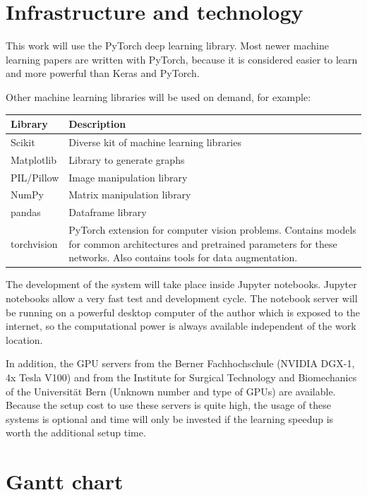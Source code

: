 \section{Infrastructure and technology}
This work will use the PyTorch\cite{paszke2017automatic} deep learning library. Most newer machine learning papers are written with PyTorch, because it is considered easier to learn and more powerful than Keras and PyTorch\cite{pytorchvstensorflow}.

Other machine learning libraries will be used on demand, for example:

\begin{tabular}{|p{3cm}|p{12.5cm}|}
    \hline
    \textbf{Library} & \textbf{Description} \\ \hline
    Scikit & Diverse kit of machine learning libraries \\ \hline
    Matplotlib & Library to generate graphs \\ \hline
    PIL/Pillow & Image manipulation library \\ \hline
    NumPy & Matrix manipulation library \\ \hline
    pandas & Dataframe library \\ \hline
    torchvision & PyTorch extension for computer vision problems. Contains models for common architectures and pretrained parameters for these networks. Also contains tools for data augmentation. \\ \hline
\end{tabular}

The development of the system will take place inside Jupyter notebooks. Jupyter notebooks allow a very fast test and development cycle. The notebook server will be running on a powerful desktop computer of the author which is exposed to the internet, so the computational power is always available independent of the work location.

In addition, the GPU servers from the Berner Fachhochschule (NVIDIA DGX-1, 4x Tesla V100) and from the Institute for Surgical Technology and Biomechanics of the Universität Bern (Unknown number and type of GPUs) are available. Because the setup cost to use these servers is quite high, the usage of these systems is optional and time will only be invested if the learning speedup is worth the additional setup time.

\section{Gantt chart}

